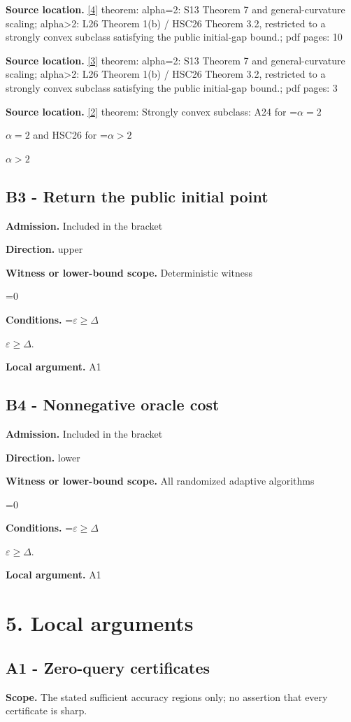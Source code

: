 \documentclass[10pt,a4paper]{article}
\newcommand{\AtlasMath}[1]{\par\begingroup\centering\setbox0=\hbox{$\displaystyle #1$}\ifdim\wd0>1.4\linewidth\typeout{ATLAS WIDE FORMULA: \the\wd0}\fi\ifdim\wd0>\linewidth\resizebox{\linewidth}{!}{\box0}\else\box0\fi\par\endgroup}
\newcommand{\AtlasInlineMath}[1]{\begingroup\setbox0=\hbox{$#1$}\ifdim\wd0>.4\linewidth\endgroup\AtlasMath{#1}\else\endgroup$#1$\fi}
\begin{document}
\textbf{Source location.} \href{https://proceedings.mlr.press/v30/Shamir13.html}{[4]} theorem: alpha=2: S13 Theorem 7 and general-curvature scaling; alpha>2: L26 Theorem 1(b) / HSC26 Theorem 3.2, restricted to a strongly convex subclass satisfying the public initial-gap bound.; pdf pages: 10

\textbf{Source location.} \href{https://arxiv.org/pdf/2610.05517v2}{[3]} theorem: alpha=2: S13 Theorem 7 and general-curvature scaling; alpha>2: L26 Theorem 1(b) / HSC26 Theorem 3.2, restricted to a strongly convex subclass satisfying the public initial-gap bound.; pdf pages: 3

\textbf{Source location.} \href{https://arxiv.org/html/2610.00276v2}{[2]} theorem: Strongly convex subclass: A24 for \AtlasInlineMath{\alpha=2} and HSC26 for \AtlasInlineMath{\alpha>2}

\subsection{B3 - Return the public initial point}
\textbf{Admission.} Included in the bracket

\textbf{Direction.} upper

\textbf{Witness or lower-bound scope.} Deterministic witness

\AtlasMath{0}
\textbf{Conditions.} \AtlasInlineMath{\varepsilon\ge \Delta}.

\textbf{Local argument.} A1

\subsection{B4 - Nonnegative oracle cost}
\textbf{Admission.} Included in the bracket

\textbf{Direction.} lower

\textbf{Witness or lower-bound scope.} All randomized adaptive algorithms

\AtlasMath{0}
\textbf{Conditions.} \AtlasInlineMath{\varepsilon\ge \Delta}.

\textbf{Local argument.} A1

\section{5. Local arguments}
\subsection{A1 - Zero-query certificates}
\textbf{Scope.} The stated sufficient accuracy regions only; no assertion that every certificate is sharp.
\end{document}
